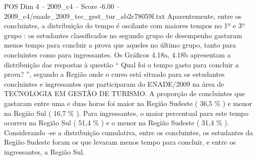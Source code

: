 \begin{textsample}{POS Dim 4 – 2009\_c4 – Score -6.00 – 2009\_c4/enade\_2009\_tec\_gest\_tur\_ab2c78059f.txt}
Aparentemente, entre os concluintes, a distribuição do tempo é oscilante com maiores tempos no 1º e 3º grupo : os estudantes classificados no segundo grupo de desempenho gastaram menos tempo para concluir a prova que aqueles no último grupo, tanto para concluintes como para ingressantes.
Os Gráficos 4.18a, 4.18b apresentam a distribuição das respostas à questão “ Qual foi o tempo gasto para concluir a prova? ”, segundo a Região onde o curso está situado para os estudantes concluintes e ingressantes que participaram do ENADE/2009 na área de TECNOLOGIA EM GESTÃO DE TURISMO.
A proporção de concluintes que gastaram entre uma e duas horas foi maior na Região Sudeste ( 36,5 \% ) e menor na Região Sul ( 16,7 \% ).
Para ingressantes, o maior percentual para este tempo ocorreu na Região Sul ( 51,4 \% ) e o menor na Região Sudeste ( 31,4 \% ).
Considerando -se a distribuição cumulativa, entre os concluintes, os estudantes da Região Sudeste foram os que levaram menos tempo para concluir, e entre os ingressantes, a Região Sul.

\end{textsample}
